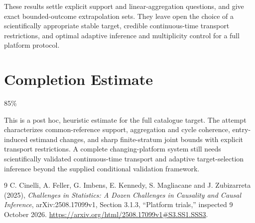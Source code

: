 \documentclass[11pt]{article}
\theoremstyle{remark}\newtheorem{remark}[theorem]{Remark}
\begin{document}
These results settle explicit support and linear-aggregation questions, and give exact bounded-outcome extrapolation sets. They leave open the choice of a scientifically appropriate stable target, credible continuous-time transport restrictions, and optimal adaptive inference and multiplicity control for a full platform protocol.

\section{Completion Estimate}
85\%

This is a post hoc, heuristic estimate for the full catalogue target.
The attempt characterizes common-reference support, aggregation and cycle coherence, entry-induced estimand changes, and sharp finite-stratum joint bounds with explicit transport restrictions. A complete changing-platform system still needs scientifically validated continuous-time transport and adaptive target-selection inference beyond the supplied conditional validation framework.

\begin{thebibliography}{9}
 C. Cinelli, A. Feller, G. Imbens, E. Kennedy, S. Magliacane and J. Zubizarreta (2025), \emph{Challenges in Statistics: A Dozen Challenges in Causality and Causal Inference}, arXiv:2508.17099v1, Section 3.1.3, ``Platform trials,'' inspected 9 October 2026. \url{https://arxiv.org/html/2508.17099v1#S3.SS1.SSS3}.
\end{thebibliography}
\end{document}
